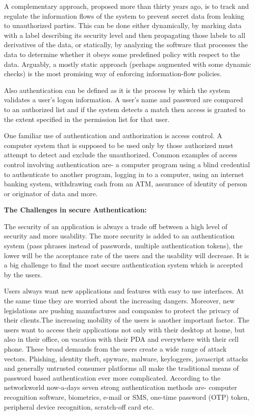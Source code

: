 A complementary approach, proposed more than thirty years ago, is to track and regulate the information flows of the system to prevent secret data from leaking to unauthorized parties. This can be done either dynamically, by marking data with a label describing its security level and then propagating those labels to all derivatives of the data, or statically, by analyzing the software that processes
the data to determine whether it obeys some predefined policy with respect to the data. Arguably, a mostly static approach (perhaps augmented with some dynamic checks) is the most promising way of enforcing information-flow policies.

Also authentication can be defined as it is the process by which the system validates a user's logon information. A user's name and password are compared to an authorized list and if the system detects a match then access is granted to the extent specified in the permission list for that user.

One familiar use of authentication and authorization is access control. A computer system that is supposed to be used only by those authorized must attempt to detect and exclude the unauthorized. Common examples of access control involving authentication are- a computer program using a blind credential to authenticate to another program, logging in to a computer, using an internet banking system, withdrawing cash from an ATM, assurance of identity of person or originator of data and more.


\textbf{The Challenges in secure Authentication:}

The security of an application is always a trade off between a high level of security and more usability. The more security is added to an authentication system (pass phrases instead of passwords, multiple authentication tokens), the lower will be the acceptance rate of the users and the usability will decrease. It is a big challenge to find the most secure authentication system which is accepted by the users. 

Users always want new applications and features with easy to use interfaces. At the same time they are worried about the increasing dangers. Moreover, new legislations are pushing manufactures and companies to protect the privacy of their clients.The increasing mobility of the users is another important factor. The users want to access their applications not only with their desktop at home, but also in their office, on vacation with their PDA and everywhere with their cell phone. 
These broad demands from the users create a wide range of attack vectors. Phishing, identity theft, spyware, malware, keyloggers, javascript attacks and generally untrusted consumer platforms all make the traditional means of password based authentication ever more complicated. According to the networkworld \cite{ref_21_networld} now-a-days seven strong authentication methods are- computer recognition software, biometrics, e-mail or SMS, one-time password (OTP) token, peripheral device recognition, scratch-off card etc.
	

